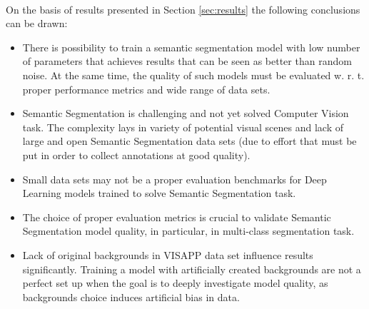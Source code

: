 \documentclass{article}
\begin{document}
\paragraph{}
On the basis of results presented in Section \ref{sec:results} the following conclusions can be drawn:
\begin{itemize}
    \item There is possibility to train a semantic segmentation model with low number of parameters that achieves results that can be seen as better than random noise. At the same time, the quality of such models must be evaluated w. r. t. proper performance metrics and wide range of data sets.
    \item Semantic Segmentation is challenging and not yet solved Computer Vision task. The complexity lays in variety of potential visual scenes and lack of large and open Semantic Segmentation data sets (due to effort that must be put in order to collect annotations at good quality).
    \item Small data sets may not be a proper evaluation benchmarks for Deep Learning models trained to solve Semantic Segmentation task.
    \item The choice of proper evaluation metrics is crucial to validate Semantic Segmentation model quality, in particular, in multi-class segmentation task.
    \item Lack of original backgrounds in VISAPP \cite{visapp} data set influence results significantly. Training a model with artificially created backgrounds are not a perfect set up when the goal is to deeply investigate model quality, as backgrounds choice induces artificial bias in data. 
\end{itemize}

  
\end{document}
